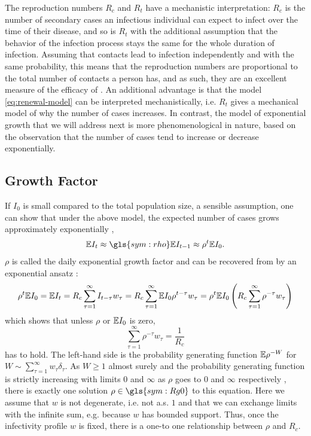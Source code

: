 The reproduction numbers $R_{c}$ and $R_{t}$ have a mechanistic interpretation: $R_{c}$ is the number of secondary cases an infectious individual can expect to infect over the time of their disease, and so is $R_{t}$ with the additional assumption that the behavior of the infection process stays the same for the whole duration of infection. 
Assuming that contacts lead to infection independently and with the same probability, this means that the reproduction numbers are proportional to the total number of contacts a person has, and as such, they are an excellent measure of the efficacy of  \citep{Brauner2021Inferring,Khazaei2023Using,Flaxman2020Estimating}. 
An additional advantage is that the model \eqref{eq:renewal-model} can be interpreted mechanistically, i.e. $R_{t}$ gives a mechanical model of why the number of cases increases. In contrast, the  model of exponential growth that we will address next is more phenomenological in nature, based on the observation that the number of cases tend to increase or decrease exponentially. 

\subsection{Growth Factor}
\label{subsec:growth_factor}
If $I_{0}$ is small compared to the total population size, a sensible assumption, one can show that under the above model, the expected number of cases grows approximately exponentially \citep[Section 1.2]{Diekmann2013Mathematical}, 
\begin{align}
    \label{eq:exponential-growth}
\E I_{t} \approx \gls{sym:rho} \E I_{t - 1} \approx \rho^{t} \E I_{0}.
\end{align}
$\rho$ is called the daily exponential growth factor and can be recovered from  by an exponential ansatz \citep{Wallinga2007How}:
$$
    \rho^{t} \mathbb E I_{0} = \mathbb E I_{t} = R_c \sum_{\tau = 1}^\infty I_{t - \tau}w_{\tau} = R_{c} \sum_{\tau = 1}^\infty \mathbb E I_{0} \rho^{t - \tau} w_{\tau} = \rho^{t} \mathbb E I_{0} \left( R_{c} \sum_{\tau = 1} ^{\infty} \rho^{-\tau}w_{\tau}\right)
$$
which shows that unless $\rho$ or $\mathbb E I_{0}$ is zero, 
$$
    \sum_{\tau = 1}^\infty \rho^{-\tau} w_{\tau} = \frac{1}{R_{c}}
$$
has to hold. The left-hand side is the probability generating function $\mathbb E \rho^{-W}$ for $W \sim \sum_{\tau = 1}^\infty w_{\tau}\delta_{\tau}$. As $W \geq 1$ almost surely and the probability generating function is strictly increasing with limits $0$ and $\infty$ as $\rho$ goes to $0$ and $\infty$ respectively , there is exactly one solution $\rho \in \gls{sym:Rg0}$ to this equation. Here we assume that $w$ is not degenerate, i.e. not a.s. $1$ and  that we can exchange limits with the infinite sum, e.g. because $w$ has bounded support. Thus, once the infectivity profile $w$ is fixed, there is a one-to one relationship between $\rho$ and $R_{c}$.


